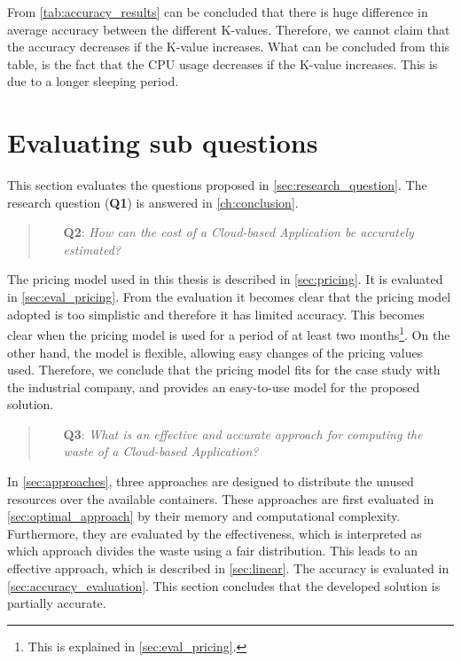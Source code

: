 \label{sec:accuracy_conclusion}
\noindent
From \autoref{tab:accuracy_results} can be concluded that there is huge difference in average accuracy between the different K-values. Therefore, we cannot claim that the accuracy decreases if the K-value increases. What can be concluded from this table, is the fact that the CPU usage decreases if the K-value increases. This is due to a longer sleeping period.

\section{Evaluating sub questions} \label{sec:subquestions}
This section evaluates the questions proposed in \autoref{sec:research_question}. The research question (\textbf{Q1}) is answered in \autoref{ch:conclusion}.

\begin{quote}
    \begin{itemize}
        \item[\textbf{Q2}: ]\textit{How can the cost of a Cloud-based Application be accurately estimated?}
    \end{itemize}
\end{quote}
\noindent
The pricing model used in this thesis is described in \autoref{sec:pricing}. It is evaluated in \autoref{sec:eval_pricing}. From the evaluation it becomes clear that the pricing model adopted is too simplistic and therefore it has limited accuracy. This becomes clear when the pricing model is used for a period of at least two months\footnote{This is explained in \autoref{sec:eval_pricing}.}. On the other hand, the model is flexible, allowing easy changes of the pricing values used. Therefore, we conclude that the pricing model fits for the case study with the industrial company, and provides an easy-to-use model for the proposed solution.


\begin{quote}
    \begin{itemize}
        \item[\textbf{Q3}: ]\textit{What is an effective and accurate approach for computing the waste of a Cloud-based Application?}
    \end{itemize}
\end{quote}
\noindent
In \autoref{sec:approaches}, three approaches are designed to distribute the unused resources over the available containers. These approaches are first evaluated in \autoref{sec:optimal_approach} by their memory and computational complexity. Furthermore, they are evaluated by the effectiveness, which is interpreted as which approach divides the waste using a fair distribution. This leads to an effective approach, which is described in \autoref{sec:linear}. The accuracy is evaluated in \autoref{sec:accuracy_evaluation}. This section concludes that the developed solution is partially accurate.

